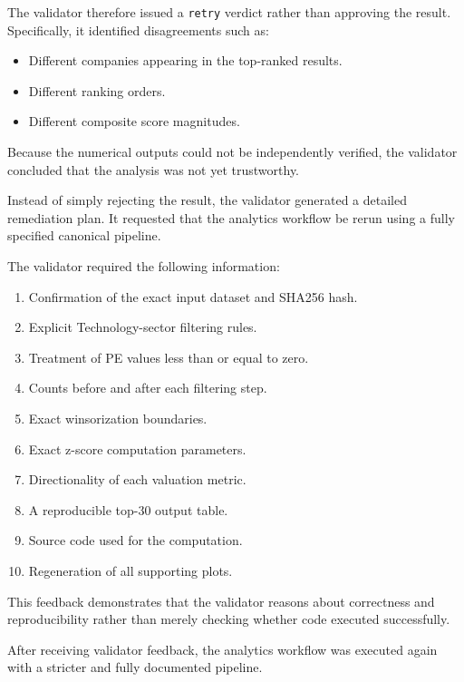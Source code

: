 The validator therefore issued a \texttt{retry} verdict rather than approving the result. Specifically, it identified disagreements such as:

\begin{itemize}
  \item Different companies appearing in the top-ranked results.
  \item Different ranking orders.
  \item Different composite score magnitudes.
\end{itemize}

Because the numerical outputs could not be independently verified, the validator concluded that the analysis was not yet trustworthy.


Instead of simply rejecting the result, the validator generated a detailed remediation plan. It requested that the analytics workflow be rerun using a fully specified canonical pipeline.

The validator required the following information:

\begin{enumerate}
  \item Confirmation of the exact input dataset and SHA256 hash.
  \item Explicit Technology-sector filtering rules.
  \item Treatment of PE values less than or equal to zero.
  \item Counts before and after each filtering step.
  \item Exact winsorization boundaries.
  \item Exact z-score computation parameters.
  \item Directionality of each valuation metric.
  \item A reproducible top-30 output table.
  \item Source code used for the computation.
  \item Regeneration of all supporting plots.
\end{enumerate}

This feedback demonstrates that the validator reasons about correctness and reproducibility rather than merely checking whether code executed successfully.


After receiving validator feedback, the analytics workflow was executed again with a stricter and fully documented pipeline.

